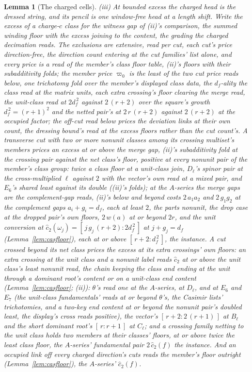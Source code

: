 \documentclass[11pt]{article}
\newtheorem{lemma}{Lemma}
\theoremstyle{definition}
\begin{document}
\begin{lemma}[The charged cells]
\emph{(iii) At bounded excess the charged head is the dressed string,
and its pencil is one window-free head at a length shift.} Write the
\emph{excess} of a charge-$c$ class for the witness gap of (ii)'s
comparison, the summed
winding floor with the excess joining to the content, the grading the charged decimation reads. The
exclusions are extensive, read per cut, each cut's price
direction-free, the direction count entering at the cut families'
list alone, and every price is a read of the member's class floor
table, (ii)'s floors with their subadditivity folds; the
\emph{member price} $\varpi_0$ is the least of the two cut price
reads below, one trichotomy fold over the member's displayed
class data, the $d_f$-ality the class read at the matrix units,
each extra crossing's floor clearing the merge read, the
unit-class read at $2d_f^{\,2}$ against $2\,(r+2)$ over the
square's growth $d_f^{\,2}=(r+1)^2$ and the netted pair's at
$2\,r\,(r+2)$ against $2\,(r+2)$ at the occupied factor; the
off-cut read below prices the deviation links at their own count,
the dressing bound's read at the excess floors rather than the
cut count's. A
transverse cut with two or more nonunit classes among its
crossing multiset's members prices an excess at or above the
\emph{merge gap}, (ii)'s subadditivity fold at the crossing pair
against the net class's floor, positive at every nonunit pair of
the member's class group: twice a class floor at a unit-class
join, $D_\ell$'s spinor pair at the cross-multiplied $\ell$
against $2$ with the vector's own read at a mixed pair, and
$E_6$'s shared least against its double ((ii)'s folds); at the
$A$-series the merge gaps are the complement-gap reads, (ii)'s
below and beyond costs $2\,a_1a_2$
and $2\,g_1g_2$ at the complement gaps $a_i+g_i=d_f$, each at least $2$, the
parts nonunit, the drop case at the dropped pair's
own floors, $2\,w(a)$ at or beyond $2r$, and the unit conversion at
$\hat c_2(\omega_j)=[\,j\,g_j\,(r+2):2d_f^{\,2}\,]$ at $j+g_j=d_f$
(Lemma~\ref{lem:casfloor}), each at or above
$[\,r+2:d_f^{\,2}\,]$, the instance. A
cut crossed beyond its net class prices the excess at its extra
crossings' own floors: an extra crossing at the unit class and a
nonunit label reads $\hat c_2$ at or above the unit class's least
nonunit read, the chain keeping the class and ending at the unit
through a dominant root's content or on a unit-class end content
(Lemma~\ref{lem:casfloor}; (ii)): $\theta$'s read one at the
$A$-series, at $D_\ell$, and at $E_6$ and $E_7$ (the unit-class
fundamentals' reads at or beyond $\theta$'s, the Casimir lists'
trichotomies, and a two-key end content at or beyond the nonunit
pair's doubled least, the display's cross reads positive), the
vector's $[\,r+2:2\,(r+1)\,]$ at $B_\ell$ and the short dominant
root's $[\,r:r+1\,]$ at $C_\ell$; and a crossing family netting
to the unit class holds two members at their classes' floors, at
or above twice the least class floor, the $A$-series' fundamental
pair $2\,\hat c_2(f)$ the instance. And an occupied link
off every charged direction's cuts reads the member's floor
outright (Lemma~\ref{lem:casfloor}), the $A$-series'
$\hat c_2(f)$.


\end{lemma}
\end{document}
